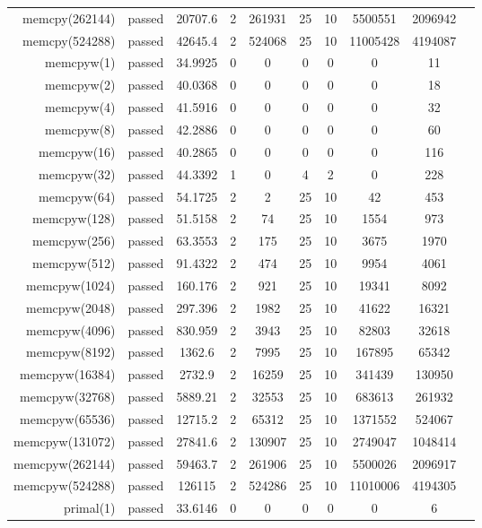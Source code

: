 \begin{longtable}{r|ccccccccc}
    memcpy(262144) & passed & 20707.6 & 2 & 261931 & 25 & 10 & 5500551 & 2096942 \\
    memcpy(524288) & passed & 42645.4 & 2 & 524068 & 25 & 10 & 11005428 & 4194087 \\
    memcpyw(1) & passed & 34.9925 & 0 & 0 & 0 & 0 & 0 & 11 \\
    memcpyw(2) & passed & 40.0368 & 0 & 0 & 0 & 0 & 0 & 18 \\
    memcpyw(4) & passed & 41.5916 & 0 & 0 & 0 & 0 & 0 & 32 \\
    memcpyw(8) & passed & 42.2886 & 0 & 0 & 0 & 0 & 0 & 60 \\
    memcpyw(16) & passed & 40.2865 & 0 & 0 & 0 & 0 & 0 & 116 \\
    memcpyw(32) & passed & 44.3392 & 1 & 0 & 4 & 2 & 0 & 228 \\
    memcpyw(64) & passed & 54.1725 & 2 & 2 & 25 & 10 & 42 & 453 \\
    memcpyw(128) & passed & 51.5158 & 2 & 74 & 25 & 10 & 1554 & 973 \\
    memcpyw(256) & passed & 63.3553 & 2 & 175 & 25 & 10 & 3675 & 1970 \\
    memcpyw(512) & passed & 91.4322 & 2 & 474 & 25 & 10 & 9954 & 4061 \\
    memcpyw(1024) & passed & 160.176 & 2 & 921 & 25 & 10 & 19341 & 8092 \\
    memcpyw(2048) & passed & 297.396 & 2 & 1982 & 25 & 10 & 41622 & 16321 \\
    memcpyw(4096) & passed & 830.959 & 2 & 3943 & 25 & 10 & 82803 & 32618 \\
    memcpyw(8192) & passed & 1362.6 & 2 & 7995 & 25 & 10 & 167895 & 65342 \\
    memcpyw(16384) & passed & 2732.9 & 2 & 16259 & 25 & 10 & 341439 & 130950 \\
    memcpyw(32768) & passed & 5889.21 & 2 & 32553 & 25 & 10 & 683613 & 261932 \\
    memcpyw(65536) & passed & 12715.2 & 2 & 65312 & 25 & 10 & 1371552 & 524067 \\
    memcpyw(131072) & passed & 27841.6 & 2 & 130907 & 25 & 10 & 2749047 & 1048414 \\
    memcpyw(262144) & passed & 59463.7 & 2 & 261906 & 25 & 10 & 5500026 & 2096917 \\
    memcpyw(524288) & passed & 126115 & 2 & 524286 & 25 & 10 & 11010006 & 4194305 \\
    primal(1) & passed & 33.6146 & 0 & 0 & 0 & 0 & 0 & 6 \\

\end{longtable}
